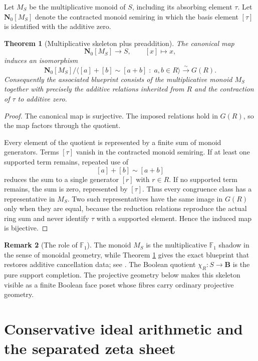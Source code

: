 \documentclass[11pt]{amsart}
\numberwithin{equation}{section}
\newtheorem{theorem}{Theorem}[section]
\theoremstyle{definition}
\newtheorem{remark}[theorem]{Remark}
\newcommand{\B}{\mathbf B}
\newcommand{\N}{\mathbf N}
\begin{document}
Let $M_S$ be the multiplicative monoid of $S$, including its absorbing element $\tau$.  Let $\N_0[M_S]$ denote the contracted monoid semiring in which the basis element $[\tau]$ is identified with the additive zero.

\begin{theorem}[Multiplicative skeleton plus preaddition]\label{thm:blueprint-presentation}
The canonical map
\[
\N_0[M_S]\longrightarrow S,
\qquad
[x]\longmapsto x,
\]
induces an isomorphism
\[
\N_0[M_S]\Big/\Big\langle [a]+[b]\sim[a+b]
\;:\;a,b\in R\Big\rangle
\xrightarrow{\sim}
G(R).
\]
Consequently the associated blueprint consists of the multiplicative monoid $M_S$ together with precisely the additive relations inherited from $R$ and the contraction of $\tau$ to additive zero.
\end{theorem}

\begin{proof}
The canonical map is surjective.  The imposed relations hold in $G(R)$, so the map factors through the quotient.

Every element of the quotient is represented by a finite sum of monoid generators.  Terms $[\tau]$ vanish in the contracted monoid semiring.  If at least one supported term remains, repeated use of
\[
[a]+[b]\sim[a+b]
\]
reduces the sum to a single generator $[r]$ with $r\in R$.  If no supported term remains, the sum is zero, represented by $[\tau]$.  Thus every congruence class has a representative in $M_S$.  Two such representatives have the same image in $G(R)$ only when they are equal, because the reduction relations reproduce the actual ring sum and never identify $\tau$ with a supported element.  Hence the induced map is bijective.
\end{proof}

\begin{remark}[The role of $\mathbb F_1$]
The monoid $M_S$ is the multiplicative $\mathbb F_1$ shadow in the sense of monoidal geometry, while Theorem \ref{thm:blueprint-presentation} gives the exact blueprint that restores additive cancellation data; see \cite{Deitmar,Lorscheid}.  The Boolean quotient $\chi_R:S\to\B$ is the pure support completion.  The projective geometry below makes this skeleton visible as a finite Boolean face poset whose fibres carry ordinary projective geometry.
\end{remark}



\section{Conservative ideal arithmetic and the separated zeta sheet}
\label{sec:ideal-zeta}
\end{document}

